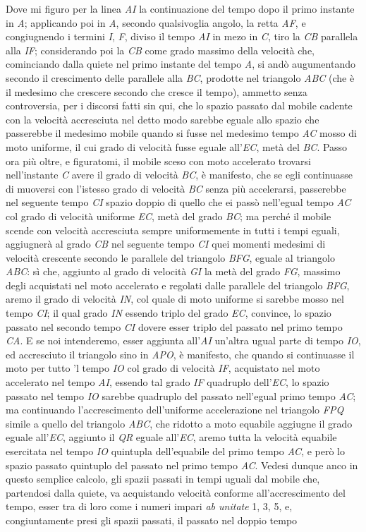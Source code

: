 \documentclass[11pt,twoside,openany]{book}
\begin{document}
Dove mi figuro per la linea \emph{AI} la continuazione del tempo dopo il primo instante in \emph{A}; applicando poi in \emph{A}, secondo qualsivoglia angolo, la retta \emph{AF}, e congiugnendo i termini \emph{I}, \emph{F}, diviso il tempo \emph{AI} in mezo in \emph{C}, tiro la \emph{CB} parallela alla \emph{IF}; considerando poi la \emph{CB} come grado massimo della velocità che, cominciando dalla quiete nel primo instante del tempo \emph{A}, si andò augumentando secondo il crescimento delle parallele alla \emph{BC}, prodotte nel triangolo \emph{ABC} (che è il medesimo che crescere secondo che cresce il tempo), ammetto senza controversia, per i discorsi fatti sin qui, che lo spazio passato dal mobile cadente con la velocità accresciuta nel detto modo sarebbe eguale allo spazio che passerebbe il medesimo mobile quando si fusse nel medesimo tempo \emph{AC} mosso di moto uniforme, il cui grado di velocità fusse eguale all'\emph{EC}, metà del \emph{BC}. Passo ora più oltre, e figuratomi, il mobile sceso con moto accelerato trovarsi nell'instante \emph{C} avere il grado di velocità \emph{BC}, è manifesto, che se egli continuasse di muoversi con l'istesso grado di velocità \emph{BC} senza più accelerarsi, passerebbe nel seguente tempo \emph{CI} spazio doppio di quello che ei passò nell'egual tempo \emph{AC} col grado di velocità uniforme \emph{EC}, metà del grado \emph{BC}; ma perché il mobile scende con velocità accresciuta sempre uniformemente in tutti i tempi eguali, aggiugnerà al grado \emph{CB} nel seguente tempo \emph{CI} quei momenti medesimi di velocità crescente secondo le parallele del triangolo \emph{BFG}, eguale al triangolo \emph{ABC}: sì che, aggiunto al grado di velocità \emph{GI} la metà del grado \emph{FG}, massimo degli acquistati nel moto accelerato e regolati dalle parallele del triangolo \emph{BFG}, aremo il grado di velocità \emph{IN}, col quale di moto uniforme si sarebbe mosso nel tempo \emph{CI}; il qual grado \emph{IN} essendo triplo del grado \emph{EC}, convince, lo spazio passato nel secondo tempo \emph{CI} dovere esser triplo del passato nel primo tempo \emph{CA}. E se noi intenderemo, esser aggiunta all'\emph{AI} un'altra ugual parte di tempo \emph{IO}, ed accresciuto il triangolo sino in \emph{APO}, è manifesto, che quando si continuasse il moto per tutto 'l tempo \emph{IO} col grado di velocità \emph{IF}, acquistato nel moto accelerato nel tempo \emph{AI}, essendo tal grado \emph{IF} quadruplo dell'\emph{EC}, lo spazio passato nel tempo \emph{IO} sarebbe quadruplo del passato nell'egual primo tempo \emph{AC}; ma continuando l'accrescimento dell'uniforme accelerazione nel triangolo \emph{FPQ} simile a quello del triangolo \emph{ABC}, che ridotto a moto equabile aggiugne il grado eguale all'\emph{EC}, aggiunto il \emph{QR} eguale all'\emph{EC}, aremo tutta la velocità equabile esercitata nel tempo \emph{IO} quintupla dell'equabile del primo tempo \emph{AC}, e però lo spazio passato quintuplo del passato nel primo tempo \emph{AC}. Vedesi dunque anco in questo semplice calcolo, gli spazii passati in tempi uguali dal mobile che, partendosi dalla quiete, va acquistando velocità conforme all'accrescimento del tempo, esser tra di loro come i numeri impari \emph{ab unitate} 1, 3, 5, e, congiuntamente presi gli spazii passati, il passato nel doppio tempo 
\end{document}
